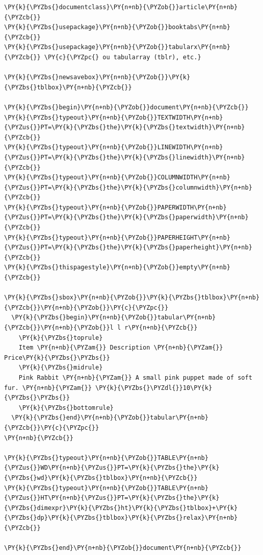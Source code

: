 \documentclass[a4paper,twoside]{article}
\begin{document}
\begin{tscode}[lang=tex, engine=pygments]
\begin{Verbatim}[commandchars=\\\{\},breaklines, breakanywhere, commandchars=\\\{\}]
\PY{k}{\PYZbs{}documentclass}\PY{n+nb}{\PYZob{}}article\PY{n+nb}{\PYZcb{}}
\PY{k}{\PYZbs{}usepackage}\PY{n+nb}{\PYZob{}}booktabs\PY{n+nb}{\PYZcb{}}
\PY{k}{\PYZbs{}usepackage}\PY{n+nb}{\PYZob{}}tabularx\PY{n+nb}{\PYZcb{}} \PY{c}{\PYZpc{} ou tabularray (tblr), etc.}

\PY{k}{\PYZbs{}newsavebox}\PY{n+nb}{\PYZob{}}\PY{k}{\PYZbs{}tblbox}\PY{n+nb}{\PYZcb{}}

\PY{k}{\PYZbs{}begin}\PY{n+nb}{\PYZob{}}document\PY{n+nb}{\PYZcb{}}
\PY{k}{\PYZbs{}typeout}\PY{n+nb}{\PYZob{}}TEXTWIDTH\PY{n+nb}{\PYZus{}}PT=\PY{k}{\PYZbs{}the}\PY{k}{\PYZbs{}textwidth}\PY{n+nb}{\PYZcb{}}
\PY{k}{\PYZbs{}typeout}\PY{n+nb}{\PYZob{}}LINEWIDTH\PY{n+nb}{\PYZus{}}PT=\PY{k}{\PYZbs{}the}\PY{k}{\PYZbs{}linewidth}\PY{n+nb}{\PYZcb{}}
\PY{k}{\PYZbs{}typeout}\PY{n+nb}{\PYZob{}}COLUMNWIDTH\PY{n+nb}{\PYZus{}}PT=\PY{k}{\PYZbs{}the}\PY{k}{\PYZbs{}columnwidth}\PY{n+nb}{\PYZcb{}}
\PY{k}{\PYZbs{}typeout}\PY{n+nb}{\PYZob{}}PAPERWIDTH\PY{n+nb}{\PYZus{}}PT=\PY{k}{\PYZbs{}the}\PY{k}{\PYZbs{}paperwidth}\PY{n+nb}{\PYZcb{}}
\PY{k}{\PYZbs{}typeout}\PY{n+nb}{\PYZob{}}PAPERHEIGHT\PY{n+nb}{\PYZus{}}PT=\PY{k}{\PYZbs{}the}\PY{k}{\PYZbs{}paperheight}\PY{n+nb}{\PYZcb{}}
\PY{k}{\PYZbs{}thispagestyle}\PY{n+nb}{\PYZob{}}empty\PY{n+nb}{\PYZcb{}}

\PY{k}{\PYZbs{}sbox}\PY{n+nb}{\PYZob{}}\PY{k}{\PYZbs{}tblbox}\PY{n+nb}{\PYZcb{}}\PY{n+nb}{\PYZob{}}\PY{c}{\PYZpc{}}
  \PY{k}{\PYZbs{}begin}\PY{n+nb}{\PYZob{}}tabular\PY{n+nb}{\PYZcb{}}\PY{n+nb}{\PYZob{}}l l r\PY{n+nb}{\PYZcb{}}
    \PY{k}{\PYZbs{}toprule}
    Item \PY{n+nb}{\PYZam{}} Description \PY{n+nb}{\PYZam{}} Price\PY{k}{\PYZbs{}\PYZbs{}}
    \PY{k}{\PYZbs{}midrule}
    Pink Rabbit \PY{n+nb}{\PYZam{}} A small pink puppet made of soft fur. \PY{n+nb}{\PYZam{}} \PY{k}{\PYZbs{}\PYZdl{}}10\PY{k}{\PYZbs{}\PYZbs{}}
    \PY{k}{\PYZbs{}bottomrule}
  \PY{k}{\PYZbs{}end}\PY{n+nb}{\PYZob{}}tabular\PY{n+nb}{\PYZcb{}}\PY{c}{\PYZpc{}}
\PY{n+nb}{\PYZcb{}}

\PY{k}{\PYZbs{}typeout}\PY{n+nb}{\PYZob{}}TABLE\PY{n+nb}{\PYZus{}}WD\PY{n+nb}{\PYZus{}}PT=\PY{k}{\PYZbs{}the}\PY{k}{\PYZbs{}wd}\PY{k}{\PYZbs{}tblbox}\PY{n+nb}{\PYZcb{}}
\PY{k}{\PYZbs{}typeout}\PY{n+nb}{\PYZob{}}TABLE\PY{n+nb}{\PYZus{}}HT\PY{n+nb}{\PYZus{}}PT=\PY{k}{\PYZbs{}the}\PY{k}{\PYZbs{}dimexpr}\PY{k}{\PYZbs{}ht}\PY{k}{\PYZbs{}tblbox}+\PY{k}{\PYZbs{}dp}\PY{k}{\PYZbs{}tblbox}\PY{k}{\PYZbs{}relax}\PY{n+nb}{\PYZcb{}}

\PY{k}{\PYZbs{}end}\PY{n+nb}{\PYZob{}}document\PY{n+nb}{\PYZcb{}}
\end{Verbatim}
\end{tscode}
\end{document}
